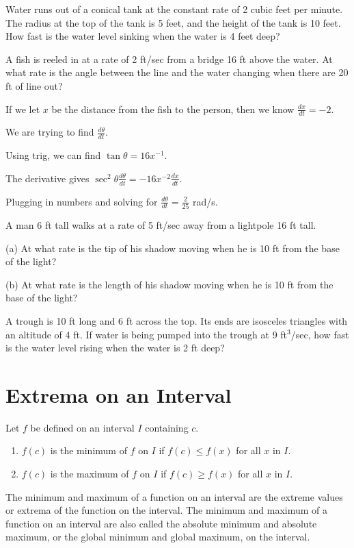 \documentclass[../bccalc.tex]{subfiles}
\begin{document}
\ex Water runs out of a conical tank at the constant rate of 2 cubic feet per minute. The radius at the top of the tank is 5 feet, and the height of the tank is 10 feet. How fast is the water level sinking when the water is 4 feet deep?
\pagebreak
\begin{example}
    A fish is reeled in at a rate of 2 ft/sec from a bridge 16 ft above the water. At what rate is the angle between the line and the water changing when there are 20 ft of line out?

    If we let $x$ be the distance from the fish to the person, then we know $\frac{dx}{dt} = -2$.

    We are trying to find $\frac{d\theta}{dt}$.

    Using trig, we can find $\tan \theta = 16x^{-1}$.

    The derivative gives $\sec^2 \theta\frac{d\theta}{dt}=-16x^{-2}\frac{dx}{dt}$.

    Plugging in numbers and solving for $\frac{d\theta}{dt}=\frac{2}{25}$ rad/s.
\end{example}

\ex A man 6 ft tall walks at a rate of 5 ft/sec away from a lightpole 16 ft tall. 

(a) At what rate is the tip of his shadow moving when he is 10 ft from the base of the light?

(b) At what rate is the length of his shadow moving when he is 10 ft from the base of the light?

\ex A trough is 10 ft long and 6 ft across the top. Its ends are isosceles triangles with an altitude of 4 ft. If water is being pumped into the trough at 9 ft$^3$/sec, how fast is the water level rising when the water is 2 ft deep?

\section{Extrema on an Interval}
\begin{definition}
    Let $f$ be defined on an interval $I$ containing $c$.
    \begin{enumerate}
        \item $f(c)$ is the minimum of $f$ on $I$ if $f(c)\leq f(x)$ for all $x$ in $I$.
        \item $f(c)$ is the maximum of $f$ on $I$ if $f(c)\geq f(x)$ for all $x$ in $I$.
    \end{enumerate}

    The minimum and maximum of a function on an interval are the extreme values or extrema of the function on the interval. The minimum and maximum of a function on an interval are also called the absolute minimum and absolute maximum, or the global minimum and global maximum, on the interval.
\end{definition}
\end{document}
